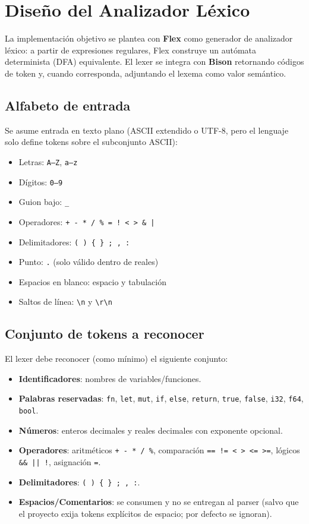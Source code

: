 \documentclass[12pt]{article}
\begin{document}
\section{Diseño del Analizador Léxico}
La implementación objetivo se plantea con \textbf{Flex} como generador de analizador léxico: a partir de expresiones regulares, Flex construye un autómata determinista (DFA) equivalente. El lexer se integra con \textbf{Bison} retornando códigos de token y, cuando corresponda, adjuntando el lexema como valor semántico.

\subsection{Alfabeto de entrada}
Se asume entrada en texto plano (ASCII extendido o UTF-8, pero el lenguaje solo define tokens sobre el subconjunto ASCII):
\begin{itemize}[nosep]
  \item Letras: \texttt{A--Z}, \texttt{a--z}
  \item Dígitos: \texttt{0--9}
  \item Guion bajo: \texttt{\_}
  \item Operadores: \texttt{+ - * / \% = ! < > \& |}
  \item Delimitadores: \texttt{( ) \{ \} ; , :}
  \item Punto: \texttt{.} (solo válido dentro de reales)
  \item Espacios en blanco: espacio y tabulación
  \item Saltos de línea: \texttt{\textbackslash n} y \texttt{\textbackslash r\textbackslash n}
\end{itemize}

\subsection{Conjunto de tokens a reconocer}
El lexer debe reconocer (como mínimo) el siguiente conjunto:
\begin{itemize}[nosep]
  \item \textbf{Identificadores}: nombres de variables/funciones.
  \item \textbf{Palabras reservadas}: \texttt{fn}, \texttt{let}, \texttt{mut}, \texttt{if}, \texttt{else}, \texttt{return}, \texttt{true}, \texttt{false}, \texttt{i32}, \texttt{f64}, \texttt{bool}.
  \item \textbf{Números}: enteros decimales y reales decimales con exponente opcional.
  \item \textbf{Operadores}: aritméticos \texttt{+ - * / \%}, comparación \texttt{== != < > <= >=}, lógicos \texttt{\&\& || !}, asignación \texttt{=}.
  \item \textbf{Delimitadores}: \texttt{( ) \{ \} ; , :}.
  \item \textbf{Espacios/Comentarios}: se consumen y no se entregan al parser (salvo que el proyecto exija tokens explícitos de espacio; por defecto se ignoran).
\end{itemize}
\end{document}
